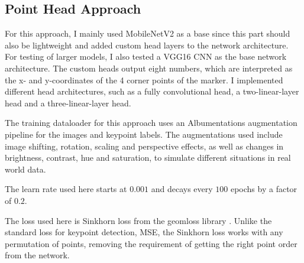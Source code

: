 \documentclass[10pt]{book}
\newcommand{\figureref}[1]{\autoref{#1}}
\begin{document}
\subsection{Point Head Approach}

For this approach, I mainly used MobileNetV2 as a base since this part should also be lightweight and added custom head layers to the network architecture. For testing of larger models, I also tested a VGG16 \ac{CNN} as the base network architecture. The custom heads output eight numbers, which are interpreted as the x- and y-coordinates of the 4 corner points of the marker. I implemented different head architectures, such as a fully convolutional head, a two-linear-layer head and a three-linear-layer head.

The training dataloader for this approach uses an Albumentations augmentation pipeline for the images and keypoint labels. The augmentations used include image shifting, rotation, scaling and perspective effects, as well as changes in brightness, contrast, hue and saturation, to simulate different situations in real world data. 

The learn rate used here starts at $0.001$ and decays every $100$ epochs by a factor of $0.2$. 


The loss used here is Sinkhorn loss from the geomloss library \cite{feydy2019interpolating}. Unlike the standard loss for keypoint detection, \ac{MSE}, the Sinkhorn loss works with any permutation of points, removing the requirement of getting the right point order from the network. 
\end{document}
